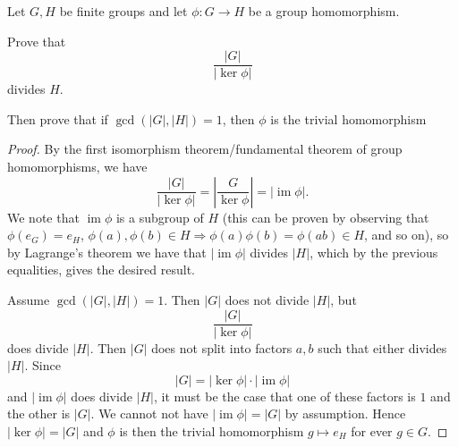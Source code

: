 \begin{prob}
    Let $G,H$ be finite groups and let 
    $\phi : G \to H$ be a group homomorphism.

    Prove that 
    \[
        \frac{|G|}{|\ker \phi|} 
    \]
    divides $H$.

    Then prove that if $\gcd(|G|,|H|) = 1$, then 
    $\phi$ is the trivial homomorphism
\end{prob}
\begin{proof}
    By the first isomorphism theorem/fundamental theorem 
    of group homomorphisms, we have 
    \[
        \frac{|G|}{|\ker \phi|} 
        = \left|\frac{G}{\ker \phi}\right| 
        = |\operatorname{im} \phi|. 
    \]
    We note that $\operatorname{im}\phi$ is a subgroup 
    of $H$ (this can be proven by observing 
    that $\phi(e_G) = e_H$, $\phi(a), \phi(b) \in H 
    \Rightarrow \phi(a)\phi(b) = \phi(ab) \in H$, and so on), 
    so by Lagrange's theorem we have 
    that $|\operatorname{im} \phi|$ divides 
    $|H|$, which by the previous equalities, 
    gives the desired result.

    Assume $\gcd(|G|,|H|) = 1$.
    Then $|G|$ does not divide $|H|$, but 
    \[
        \frac{|G|}{|\ker \phi|}
    \]
    does divide $|H|$.
    Then $|G|$ does not split into factors 
    $a,b$ such that either divides $|H|$.
    Since  
    \[
        |G| = |\ker \phi| \cdot |\operatorname{im} \phi|
    \]
    and $|\operatorname{im} \phi|$ does divide $|H|$, it must 
    be the case that one of these factors is $1$ 
    and the other is $|G|$. We cannot not 
    have $|\operatorname{im} \phi| = |G|$ by assumption. Hence 
    $|\ker \phi| = |G|$ and $\phi$ is then the 
    trivial homomorphism $g \mapsto e_H$ for ever 
    $g \in G$.
\end{proof}


